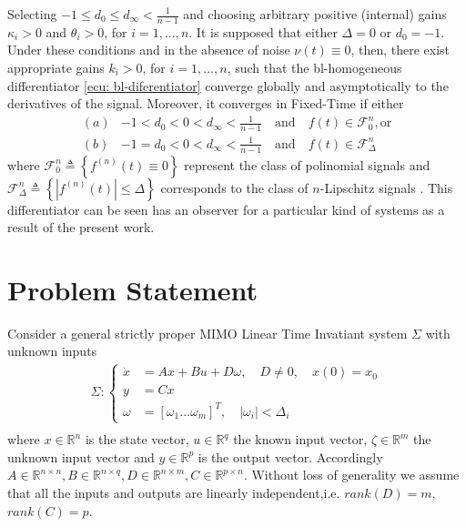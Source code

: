 \documentclass[11pt,letterpaper,twoside,openright]{report}
\begin{document}
Selecting $-1 \leq d_0 \leq d_{\infty} < \frac{1}{n-1}$ and choosing arbitrary positive (internal) gains $\kappa_i > 0$ and $\theta_i > 0$, for $i = 1,...,n$. It is supposed that either $\Delta=0$ or $d_0=-1$. Under these conditions and in the absence of noise $\nu(t)\equiv 0$, then, there exist appropriate gains $k_i>0$, for $i=1,...,n$, such that the bl-homogeneous differentiator \eqref{ecu: bl-diferentiator} converge globally and asymptotically to the derivatives of the signal. Moreover, it converges in Fixed-Time if either
\begin{equation}
\begin{split}
(a) &-1<d_0<0<d_{\infty}<\frac{1}{n-1}  \quad \textrm{and} \quad f(t) \in \mathscr{F}^{n}_{0}, \textrm{or} \\
(b) &-1=d_0<0<d_{\infty}<\frac{1}{n-1} \quad \textrm{and} \quad f(t) \in \mathscr{F}^{n}_{\Delta}
\end{split}
\end{equation}
where $\mathscr{F}^{n}_{0} \triangleq \left\lbrace f^{(n)}(t) \equiv 0 \right\rbrace$ represent the class of polinomial signals and $\mathscr{F}^{n}_{\Delta} \triangleq \left\lbrace \left| f^{(n)}(t)\right| \leq \Delta \right\rbrace$ corresponds to the class of $n$-Lipschitz signals \cite{Moreno2021}. This differentiator can be seen has an observer for a particular kind of systems as a result of the present work.


\section{Problem Statement}
Consider a general strictly proper MIMO Linear Time Invatiant system $\Sigma$ with unknown inputs
\begin{equation}\label{ecu: Sigma}
\begin{split}
\Sigma: \left\{
\begin{array}{rl}
\dot{x} &= Ax + Bu +D\omega,\quad D\neq 0, \quad x(0)=x_0 \\
y&=Cx \\
\omega &= [\omega_1 ... \omega_m]^T, \quad |\omega_i|<\Delta_i
\end{array}
\right. \\
\end{split}
\end{equation}
where $x \in \mathbb{R}^n$ is the state vector, $u \in \mathbb{R}^q$ the known input vector, $\zeta \in \mathbb{R}^m$ the unknown input vector and $y \in \mathbb{R}^p$ is the output vector. Accordingly $A\in \mathbb{R}^{n\times n},B\in \mathbb{R}^{n\times q},D\in \mathbb{R}^{n\times m},C\in \mathbb{R}^{p\times n}$. Without loss of generality we assume that all the inputs and outputs are linearly independent,i.e. $rank(D)=m$,$rank(C)=p$.
\end{document}
